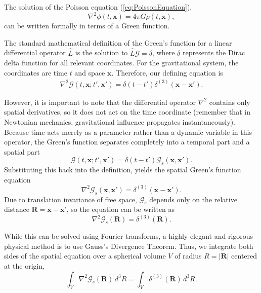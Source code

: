 The solution of the Poisson equation (\ref{eq:PoissonEquation}),
\begin{equation}
\nabla^2 \phi (t, \textbf{x})= 4\pi G \rho (t, \textbf{x}),
\end{equation}
can be written formally in terms of a Green function. 

The standard mathematical definition of the Green's function for a linear differential operator $\hat{L}$ is the solution to $\hat{L}\mathcal{G} = \delta$, where $\delta$ represents the Dirac delta function for all relevant coordinates. For the gravitational system, the coordinates are time $t$ and space $\textbf{x}$. Therefore, our defining equation is
\begin{eqnarray}
    \nabla^2 \mathcal{G}(t, \textbf{x}; t', \textbf{x}') = \delta(t - t') \delta^{(3)}(\textbf{x} - \textbf{x}').
\end{eqnarray}

However, it is important to note that  the differential operator $\nabla^2$ contains only spatial derivatives, so it does not act on the time coordinate (remember that in Newtonian mechanics, gravitational influence propagates instantaneously). Because time acts merely as a parameter rather than a dynamic variable in this operator, the Green's function separates completely into a temporal part and a spatial part
\begin{equation}
    \mathcal{G}(t, \textbf{x}; t', \textbf{x}') = \delta(t - t') \mathcal{G}_s(\textbf{x}, \textbf{x}').
\end{equation}
Substituting this back into the definition, yields the spatial Green's function equation
\begin{equation}
    \nabla^2 \mathcal{G}_s(\textbf{x}, \textbf{x}') = \delta^{(3)}(\textbf{x} - \textbf{x}').
\end{equation}
Due to translation invariance of free space, $\mathcal{G}_s$ depends only on the relative distance $\textbf{R} = \textbf{x} - \textbf{x}'$, so the equation can be written as 
\begin{equation}
    \nabla^2 \mathcal{G}_s(\textbf{R}) = \delta^{(3)}(\textbf{R}).
\end{equation}

While this can be solved using Fourier transforms, a highly elegant and rigorous physical method is to use Gauss's Divergence Theorem. Thus, we integrate both sides of the spatial equation over a spherical volume $V$ of radius $R=|\textbf{R}|$ centered at the origin,
\begin{equation}
    \int_V \nabla^2 \mathcal{G}_s(\textbf{R}) \, d^3R = \int_V \delta^{(3)}(\textbf{R}) \, d^3R.
\end{equation}

